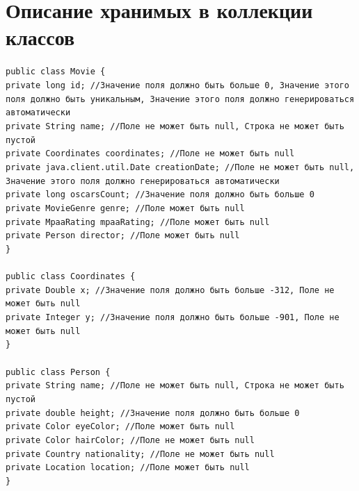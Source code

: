 \newpage

\section{Описание хранимых в коллекции классов}
\noindent\texttt{рublic class Movie \{ \\
    private long id; //Значение поля должно быть больше 0, Значение этого поля должно быть уникальным, Значение этого поля должно генерироваться автоматически\\
    private String name; //Поле не может быть null, Строка не может быть пустой\\
    private Coordinates coordinates; //Поле не может быть null\\
    private java.client.util.Date creationDate; //Поле не может быть null, Значение этого поля должно генерироваться автоматически\\
    private long oscarsCount; //Значение поля должно быть больше 0\\
    private MovieGenre genre; //Поле может быть null\\
    private MpaaRating mpaaRating; //Поле может быть null\\
    private Person director; //Поле может быть null\\
    \} \\
    \\
    public class Coordinates \{ \\
    private Double x; //Значение поля должно быть больше -312, Поле не может быть null\\
    private Integer y; //Значение поля должно быть больше -901, Поле не может быть null\\
    \} \\
    \\
    public class Person \{ \\
    private String name; //Поле не может быть null, Строка не может быть пустой\\
    private double height; //Значение поля должно быть больше 0\\
    private Color eyeColor; //Поле может быть null\\
    private Color hairColor; //Поле не может быть null\\
    private Country nationality; //Поле не может быть null\\
    private Location location; //Поле может быть null\\
    \} \\
}
